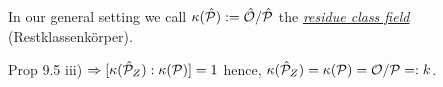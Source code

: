\begin{defi}
In our general setting we call $\kappa(\hat{\mathcal{P}}):= \hat{\mathcal{O}}/\hat{\mathcal{P}}$ the \emph{\underline{residue class field}} (\glqq Restklassenkörper\grqq).
\end{defi}

\begin{Bem}
Prop 9.5 iii) $\Rightarrow [\kappa(\hat{\mathcal{P}}_Z):\kappa(\mathcal{P})]=1$ hence, $\kappa(\hat{\mathcal{P}}_Z)=\kappa(\mathcal{P})=\mathcal{O}/\mathcal{P}=:k$.
\end{Bem}